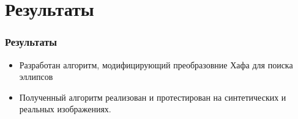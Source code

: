 \documentclass[14pt]{beamer}
\begin{document}
\section{Результаты}
\begin{frame}
\frametitle{Результаты}
\begin{block}{}
\begin{itemize}
  \item Разработан алгоритм, модифицирующий преобразовние Хафа для поиска эллипсов
  \item Полученный алгоритм реализован и протестирован на синтетических и реальных изображениях.
\end{itemize}
\end{block}
\end{frame}
\end{document}
